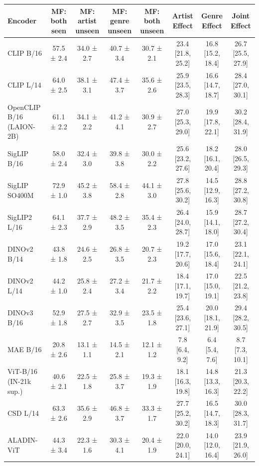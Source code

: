 \begin{tabular}{lccccccc}
\toprule
Encoder & MF: both seen & MF: artist unseen & MF: genre unseen & MF: both unseen & Artist Effect & Genre Effect & Joint Effect \\
\midrule
CLIP B/16 & 57.5 ± 2.4 & 34.0 ± 2.7 & 40.7 ± 3.4 & 30.7 ± 2.1 & 23.4 [21.8, 25.2] & 16.8 [15.2, 18.4] & 26.7 [25.5, 27.9] \\
CLIP L/14 & 64.0 ± 2.5 & 38.1 ± 3.1 & 47.4 ± 3.7 & 35.6 ± 2.6 & 25.9 [23.5, 28.3] & 16.6 [14.7, 18.7] & 28.4 [27.0, 30.1] \\
OpenCLIP B/16 (LAION-2B) & 61.1 ± 2.2 & 34.1 ± 2.2 & 41.2 ± 4.1 & 30.9 ± 2.7 & 27.0 [25.3, 29.0] & 19.9 [17.8, 22.1] & 30.2 [28.4, 31.9] \\
SigLIP B/16 & 58.0 ± 2.4 & 32.4 ± 3.0 & 39.8 ± 3.8 & 30.0 ± 2.2 & 25.6 [23.2, 27.6] & 18.2 [16.1, 20.4] & 28.0 [26.5, 29.3] \\
SigLIP SO400M & 72.9 ± 1.0 & 45.2 ± 3.8 & 58.4 ± 2.8 & 44.1 ± 3.0 & 27.8 [25.6, 30.2] & 14.5 [12.9, 16.3] & 28.8 [27.2, 30.8] \\
SigLIP2 L/16 & 64.1 ± 2.3 & 37.7 ± 2.9 & 48.2 ± 3.5 & 35.4 ± 2.3 & 26.4 [24.0, 28.7] & 15.9 [14.1, 18.0] & 28.7 [27.2, 30.4] \\
DINOv2 B/14 & 43.8 ± 1.8 & 24.6 ± 2.5 & 26.8 ± 3.5 & 20.7 ± 2.3 & 19.2 [17.7, 20.6] & 17.0 [15.6, 18.4] & 23.1 [22.1, 24.1] \\
DINOv2 L/14 & 44.2 ± 1.0 & 25.8 ± 2.4 & 27.2 ± 3.4 & 21.7 ± 2.2 & 18.4 [17.1, 19.7] & 17.0 [15.0, 19.1] & 22.5 [21.2, 23.8] \\
DINOv3 B/16 & 52.9 ± 1.8 & 27.5 ± 2.7 & 32.9 ± 3.5 & 23.5 ± 1.8 & 25.4 [23.6, 27.1] & 20.0 [18.1, 21.9] & 29.4 [28.2, 30.5] \\
MAE B/16 & 20.8 ± 2.6 & 13.1 ± 1.1 & 14.5 ± 2.1 & 12.1 ± 1.2 & 7.8 [6.4, 9.2] & 6.4 [5.4, 7.6] & 8.7 [7.3, 10.1] \\
ViT-B/16 (IN-21k sup.) & 40.6 ± 2.1 & 22.5 ± 1.8 & 25.8 ± 3.7 & 19.3 ± 1.9 & 18.1 [16.3, 19.8] & 14.8 [13.3, 16.3] & 21.3 [20.3, 22.2] \\
CSD L/14 & 63.3 ± 2.6 & 35.6 ± 2.9 & 46.8 ± 3.7 & 33.3 ± 1.7 & 27.7 [25.2, 30.2] & 16.5 [14.7, 18.3] & 30.0 [28.3, 31.7] \\
ALADIN-ViT & 44.3 ± 3.4 & 22.3 ± 1.6 & 30.3 ± 4.1 & 20.4 ± 1.9 & 22.0 [20.0, 24.1] & 14.0 [12.0, 16.4] & 23.9 [21.9, 26.0] \\
\bottomrule
\end{tabular}
